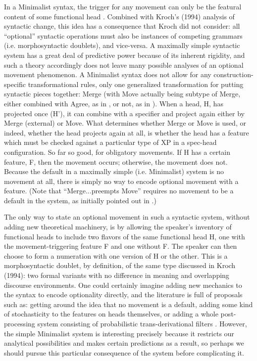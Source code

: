 In a Minimalist syntax, the trigger for any movement can only be the featural content of some functional head \citep{chomsky2000, chomsky2001}.
Combined with Kroch's (1994) analysis of syntactic change, this idea has a consequence that Kroch did not consider: all ``optional'' syntactic operations must also be instances of competing grammars (i.e. morphosyntactic doublets), and vice-versa.
A maximally simple syntactic system has a great deal of predictive power because of its inherent rigidity, and such a theory accordingly does not leave many possible analyses of an optional movement phenomenon.
A Minimalist syntax does not allow for any construction-specific transformational rules, only one generalized transformation for putting syntactic pieces together: Merge (with Move actually being subtype of Merge, either combined with Agree, as in \citealt{chomsky2000}, or not, as in \citealt{chomsky2004, chomsky2008}).
When a head, H, has projected once (H'), it can combine with a specifier and project again either by Merge (external) or Move.
What determines whether Merge or Move is used, or indeed, whether the head projects again at all, is whether the head has a feature which must be checked against a particular type of XP in a spec-head configuration.
So far so good, for obligatory movements.
If H has a certain feature, F, then the movement occurs; otherwise, the movement does not.
Because the default in a maximally simple (i.e. Minimalist) system is no movement at all, there is simply no way to encode optional movement with a feature.
(Note that ``Merge...preempts Move'' requires no movement to be a default in the system, as initially pointed out in \citealt{chomsky2000}.)

The only way to state an optional movement in such a syntactic system, without adding new theoretical machinery, is by allowing the speaker's inventory of functional heads to include two flavors of the same functional head H, one with the movement-triggering feature F and one without F.
The speaker can then choose to form a numeration with one version of H or the other.
This is a morphosyntactic doublet, by definition, of the same type discussed in Kroch (1994): two formal variants with no difference in meaning and overlapping discourse environments.
One could certainly imagine adding new mechanics to the syntax to encode optionality directly, and the literature is full of proposals such as: getting around the idea that no movement is a default, adding some kind of stochasticity to the features on heads themselves, or adding a whole post-processing system consisting of probabilistic trans-derivational filters .
However, the simple Minimalist system is interesting precisely because it restricts our analytical possibilities and makes certain predictions as a result, so perhaps we should pursue this particular consequence of the system before complicating it.

